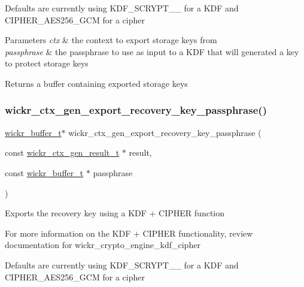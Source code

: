 Defaults are currently using K\+D\+F\+\_\+\+S\+C\+R\+Y\+P\+T\+\_\+\_ for a K\+DF and C\+I\+P\+H\+E\+R\+\_\+\+A\+E\+S256\+\_\+\+G\+CM for a cipher


\begin{DoxyParams}{Parameters}
{\em ctx} & the context to export storage keys from \\
\hline
{\em passphrase} & the passphrase to use as input to a K\+DF that will generated a key to protect storage keys \\
\hline
\end{DoxyParams}
\begin{DoxyReturn}{Returns}
a buffer containing exported storage keys 
\end{DoxyReturn}
\mbox{\label{group__wickr__ctx_ga2dadd40adc0217dd337ee6cf745cbc12}} 
\subsubsection{\texorpdfstring{wickr\+\_\+ctx\+\_\+gen\+\_\+export\+\_\+recovery\+\_\+key\+\_\+passphrase()}{wickr\_ctx\_gen\_export\_recovery\_key\_passphrase()}}
{\footnotesize\ttfamily \hyperlink{structwickr__buffer}{wickr\+\_\+buffer\+\_\+t}$\ast$ wickr\+\_\+ctx\+\_\+gen\+\_\+export\+\_\+recovery\+\_\+key\+\_\+passphrase (\begin{DoxyParamCaption}\item[{const \hyperlink{structwickr__ctx__gen__result}{wickr\+\_\+ctx\+\_\+gen\+\_\+result\+\_\+t} $\ast$}]{result,  }\item[{const \hyperlink{structwickr__buffer}{wickr\+\_\+buffer\+\_\+t} $\ast$}]{passphrase }\end{DoxyParamCaption})}

Exports the recovery key using a K\+DF + C\+I\+P\+H\+ER function

For more information on the K\+DF + C\+I\+P\+H\+ER functionality, review documentation for \textquotesingle{}wickr\+\_\+crypto\+\_\+engine\+\_\+kdf\+\_\+cipher\textquotesingle{}

Defaults are currently using K\+D\+F\+\_\+\+S\+C\+R\+Y\+P\+T\+\_\+\_ for a K\+DF and C\+I\+P\+H\+E\+R\+\_\+\+A\+E\+S256\+\_\+\+G\+CM for a cipher



